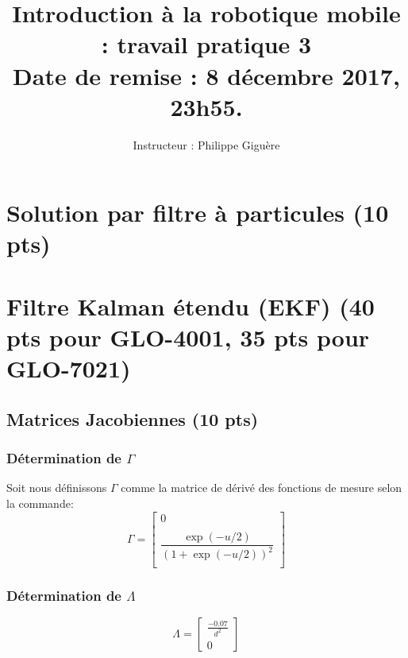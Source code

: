 \documentclass[12pt]{article}
\begin{document}
\title{Introduction à la robotique mobile : travail pratique 3  \\  Date de remise : 8 décembre 2017, 23h55.}
\author{Instructeur : Philippe Giguère}

\maketitle

\section {Solution par filtre à particules (10 pts)}


\section{Filtre Kalman étendu (EKF) (40 pts pour GLO-4001, 35 pts pour GLO-7021)}
\label{EKF}

\subsection{Matrices Jacobiennes (10 pts)}

\subsubsection{Détermination de $\Gamma$}
Soit nous définissons $\Gamma$ comme la matrice de dérivé des fonctions de mesure selon la commande:
\begin{equation}
\Gamma =
\begin{bmatrix}
    0   \\
    \\
    \dfrac{\exp(-u/2)}{(1+\exp(-u/2))^2} \\
\end{bmatrix}
\end{equation}

\subsubsection{Détermination de $\Lambda$}
\begin{equation}
\Lambda =
\begin{bmatrix}
    \frac{-0.07}{d^2}   \\
    0
\end{bmatrix}
\end{equation}
\end{document}
